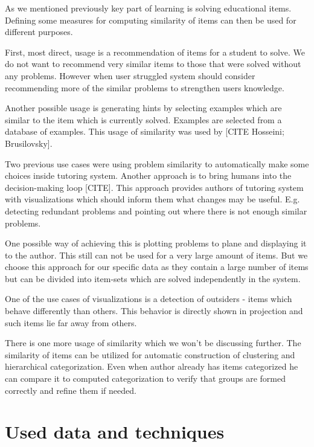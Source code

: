 \documentclass[
  digital, %
  table,   %
  nolof,     %
  nolot,     %
  nocover
]{fithesis3}
\begin{document}
As we mentioned previously key part of learning is solving educational items. Defining some measures for computing similarity of items can then be used for different purposes.

First, most direct, usage is a recommendation of items for a student to solve. We do not want to recommend very similar items to those that were solved without any problems. However when user struggled system should consider recommending more of the similar problems to strengthen users knowledge.

Another possible usage is generating hints by selecting examples which are similar to the item which is currently solved. Examples are selected from a database of examples. This usage of similarity was used by [CITE Hosseini; Brusilovsky].

Two previous use cases were using problem similarity to automatically make some choices inside tutoring system. Another approach is to bring humans into the decision-making loop [CITE]. This approach provides authors of tutoring system with visualizations which should inform them what changes may be useful. E.g. detecting redundant problems and pointing out where there is not enough similar problems.

One possible way of achieving this is plotting problems to plane and displaying it to the author. This still can not be used for a very large amount of items. But we choose this approach for our specific data as they contain a large number of items but can be divided into item-sets which are solved independently in the system.

One of the use cases of visualizations is a detection of outsiders - items which behave differently than others. This behavior is directly shown in projection and such items lie far away from others.

There is one more usage of similarity which we won't be discussing further. The similarity of items can be utilized for automatic construction of clustering and hierarchical categorization. Even when author already has items categorized he can compare it to computed categorization to verify that groups are formed correctly and refine them if needed.

\chapter{Used data and techniques}\label{used-data-and-techniques}

\end{document}
